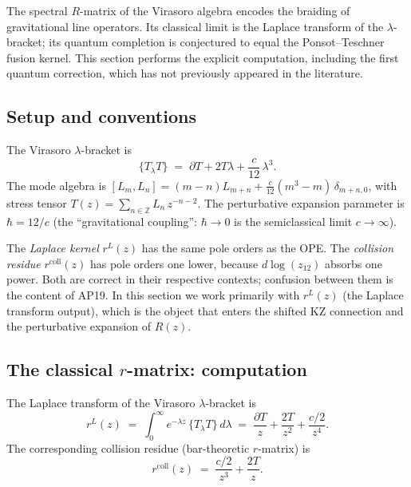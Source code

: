 \documentclass[11pt]{article}
\newcommand{\Z}{\mathbb{Z}}
\begin{document}
The spectral $R$-matrix of the Virasoro algebra encodes the
braiding of gravitational line operators.  Its classical limit is
the Laplace transform of the $\lambda$-bracket; its quantum
completion is conjectured to equal the Ponsot--Teschner fusion
kernel.  This section performs the explicit computation,
including the first quantum correction, which has not previously
appeared in the literature.

\subsection{Setup and conventions}

The Virasoro $\lambda$-bracket is
\begin{equation}\label{eq:vir-lambda-R}
\{T{}_\lambda T\}
\;=\;
\partial T + 2T\lambda + \frac{c}{12}\,\lambda^3.
\end{equation}
The mode algebra is $[L_m, L_n] = (m-n)L_{m+n} +
\frac{c}{12}(m^3 - m)\,\delta_{m+n,0}$, with stress tensor
$T(z) = \sum_{n \in \Z} L_n\, z^{-n-2}$.  The perturbative
expansion parameter is $\hbar = 12/c$ (the ``gravitational
coupling'': $\hbar \to 0$ is the semiclassical limit $c \to \infty$).

\begin{warning}
The \emph{Laplace kernel} $r^L(z)$ has the same pole orders as the
OPE.  The \emph{collision residue} $r^{\mathrm{coll}}(z)$ has pole
orders one lower, because $d\log(z_{12})$ absorbs one power.  Both
are correct in their respective contexts; confusion between them is
the content of AP19.  In this section we work primarily with
$r^L(z)$ (the Laplace transform output), which is the object that
enters the shifted KZ connection and the perturbative expansion of
$R(z)$.
\end{warning}

\subsection{The classical $r$-matrix: computation}

\begin{proposition}
\label{prop:vir-laplace-R}
The Laplace transform of the Virasoro $\lambda$-bracket is
\begin{equation}\label{eq:vir-rL-R}
r^L(z)
\;=\;
\int_0^\infty e^{-\lambda z}\,\{T{}_\lambda T\}\,d\lambda
\;=\;
\frac{\partial T}{z}
+ \frac{2T}{z^2}
+ \frac{c/2}{z^4}.
\end{equation}
The corresponding collision residue (bar-theoretic $r$-matrix) is
\begin{equation}\label{eq:vir-rcoll-R}
r^{\mathrm{coll}}(z)
\;=\;
\frac{c/2}{z^3}
+ \frac{2T}{z}.
\end{equation}
\end{proposition}
\end{document}

